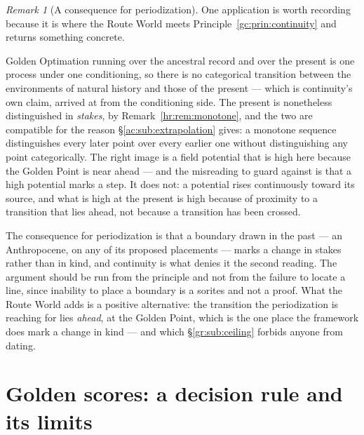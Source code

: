\documentclass[11pt]{article}
\numberwithin{equation}{section}
\theoremstyle{plain}
\theoremstyle{definition}
\theoremstyle{remark}
\newtheorem{remark}[theorem]{Remark}
\begin{document}
\begin{remark}[A consequence for periodization]\label{gc:rem:periodization}
One application is worth recording because it is where the Route World
meets Principle~\ref{gc:prin:continuity} and returns something concrete.

Golden Optimation running over the ancestral record and over the present
is one process under one conditioning, so there is no categorical
transition between the environments of natural history and those of the
present --- which is continuity's own claim, arrived at from the
conditioning side. The present is nonetheless distinguished in
\emph{stakes}, by Remark~\ref{hr:rem:monotone}, and the two are
compatible for the reason \S\ref{ac:sub:extrapolation} gives: a
monotone sequence distinguishes every later point over every earlier one
without distinguishing any point categorically. The right image is a
field potential that is high here because the Golden Point is near ahead
--- and the misreading to guard against is that a high potential marks a
step. It does not: a potential rises continuously toward its source, and
what is high at the present is high because of proximity to a transition
that lies ahead, not because a transition has been crossed.

The consequence for periodization is that a boundary drawn in the past
--- an Anthropocene, on any of its proposed placements --- marks a
change in stakes rather than in kind, and continuity is what denies it
the second reading. The argument should be run from the principle and
not from the failure to locate a line, since inability to place a
boundary is a sorites and not a proof. What the Route World adds is a
positive alternative: the transition the periodization is reaching for
lies \emph{ahead}, at the Golden Point, which is the one place the
framework does mark a change in kind --- and which
\S\ref{gr:sub:ceiling} forbids anyone from dating.
\end{remark}


\section{Golden scores: a decision rule and its limits}\label{gs:sec}
\end{document}
